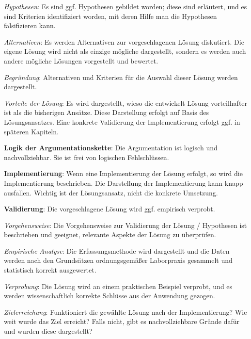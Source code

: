 \begin{checklist}
\begin{checklist}
        \item \textit{Hypothesen}: Es sind ggf. Hypothesen gebildet worden; diese sind erläutert, und es sind Kriterien identifiziert worden, mit deren Hilfe man die Hypothesen falsifizieren kann.
        \item \textit{Alternativen}: Es werden Alternativen zur vorgeschlagenen Lösung diskutiert. Die eigene Lösung wird nicht als einzige mögliche dargestellt, sondern es werden auch andere mögliche Lösungen vorgestellt und bewertet.
        \item \textit{Begründung}: Alternativen und Kriterien für die Auswahl dieser Lösung werden dargestellt.
        \item \textit{Vorteile der Lösung}: Es wird dargestellt, wieso die entwickelt Lösung vorteilhafter ist als die bisherigen Ansätze. Diese Darstellung erfolgt auf Basis des Lösungsansatzes. Eine konkrete Validierung der Implementierung erfolgt ggf. in späteren Kapiteln.
    \end{checklist}
  \item \textbf{Logik der Argumentationskette}: Die Argumentation ist logisch und nachvollziehbar. Sie ist frei von logischen Fehlschlüssen.
  \item \textbf{Implementierung}: Wenn eine Implementierung der Lösung erfolgt, so wird die Implementierung beschrieben. Die Darstellung der Implementierung kann knapp ausfallen. Wichtig ist der Lösungsansatz, nicht die konkrete Umsetzung.
  \item \textbf{Validierung}: Die vorgeschlagene Lösung wird ggf. empirisch verprobt.
    \begin{checklist}
        \item \textit{Vorgehensweise}: Die Vorgehensweise zur Validierung der Lösung / Hypothesen ist beschrieben und geeignet, relevante Aspekte der Lösung zu überprüfen.
        \item \textit{Empirische Analyse}: Die Erfassungsmethode wird dargestellt und die Daten werden nach den Grundsätzen ordnungsgemäßer Laborpraxis gesammelt und statistisch korrekt ausgewertet.
        \item \textit{Verprobung}: Die Lösung wird an einem praktischen Beispiel verprobt, und es werden wissenschaftlich korrekte Schlüsse aus der Anwendung gezogen.
        \item \textit{Zielerreichung}: Funktioniert die gewählte Lösung nach der Implementierung? Wie weit wurde das Ziel erreicht? Falls nicht, gibt es nachvollziehbare Gründe dafür und wurden diese dargestellt?

\end{checklist}
\end{checklist}
